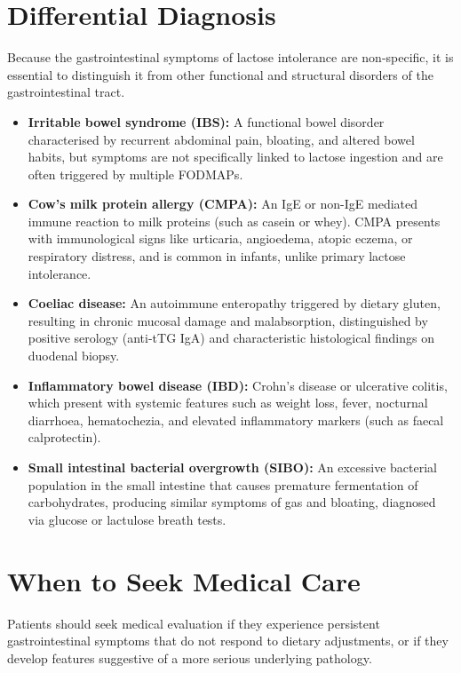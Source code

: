 \section*{Differential Diagnosis}
Because the gastrointestinal symptoms of lactose intolerance are non-specific, it is essential to distinguish it from other functional and structural disorders of the gastrointestinal tract.

\begin{itemize}
    \item \textbf{Irritable bowel syndrome (IBS):} A functional bowel disorder characterised by recurrent abdominal pain, bloating, and altered bowel habits, but symptoms are not specifically linked to lactose ingestion and are often triggered by multiple FODMAPs.
    \item \textbf{Cow's milk protein allergy (CMPA):} An IgE or non-IgE mediated immune reaction to milk proteins (such as casein or whey). CMPA presents with immunological signs like urticaria, angioedema, atopic eczema, or respiratory distress, and is common in infants, unlike primary lactose intolerance.
    \item \textbf{Coeliac disease:} An autoimmune enteropathy triggered by dietary gluten, resulting in chronic mucosal damage and malabsorption, distinguished by positive serology (anti-tTG IgA) and characteristic histological findings on duodenal biopsy.
    \item \textbf{Inflammatory bowel disease (IBD):} Crohn's disease or ulcerative colitis, which present with systemic features such as weight loss, fever, nocturnal diarrhoea, hematochezia, and elevated inflammatory markers (such as faecal calprotectin).
    \item \textbf{Small intestinal bacterial overgrowth (SIBO):} An excessive bacterial population in the small intestine that causes premature fermentation of carbohydrates, producing similar symptoms of gas and bloating, diagnosed via glucose or lactulose breath tests.
\end{itemize}

\section*{When to Seek Medical Care}
Patients should seek medical evaluation if they experience persistent gastrointestinal symptoms that do not respond to dietary adjustments, or if they develop features suggestive of a more serious underlying pathology.

